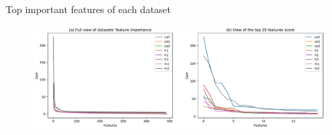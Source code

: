 \documentclass{beamer}
\begin{document}
\begin{frame}{Top important features of each dataset}
   \begin{figure}[h!]
    \centering
      \includegraphics[width=\textwidth]{images/3_feature_importance.pdf}
      
    
\end{figure}
\end{frame}
\end{document}
